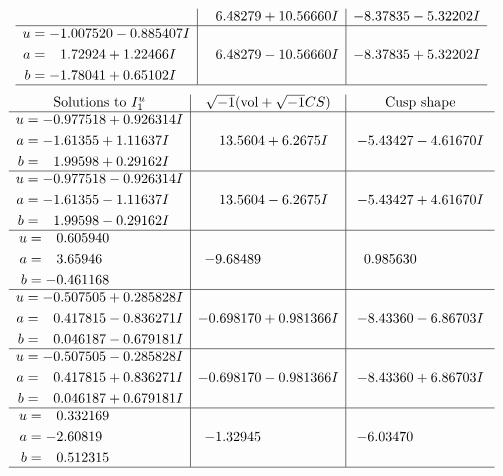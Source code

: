 \documentclass[1p]{elsarticle_modified}
\theoremstyle{definition}
\newcommand{\I}{\sqrt{-1}}
\begin{document}
$$\begin{array}{c|c|c}
 & \phantom{-}6.48279 + 10.56660 I & -8.37835 - 5.32202 I \\ \hline\begin{aligned}
u &= -1.007520 - 0.885407 I \\
a &= \phantom{-}1.72924 + 1.22466 I \\
b &= -1.78041 + 0.65102 I\end{aligned}
 & \phantom{-}6.48279 - 10.56660 I & -8.37835 + 5.32202 I\\
 \hline 
 \end{array}$$\newpage$$\begin{array}{c|c|c}  
\text{Solutions to }I^u_{1}& \I (\text{vol} + \sqrt{-1}CS) & \text{Cusp shape}\\
 \hline 
\begin{aligned}
u &= -0.977518 + 0.926314 I \\
a &= -1.61355 + 1.11637 I \\
b &= \phantom{-}1.99598 + 0.29162 I\end{aligned}
 & \phantom{-}13.5604 + 6.2675 I & -5.43427 - 4.61670 I \\ \hline\begin{aligned}
u &= -0.977518 - 0.926314 I \\
a &= -1.61355 - 1.11637 I \\
b &= \phantom{-}1.99598 - 0.29162 I\end{aligned}
 & \phantom{-}13.5604 - 6.2675 I & -5.43427 + 4.61670 I \\ \hline\begin{aligned}
u &= \phantom{-}0.605940\phantom{ +0.000000I} \\
a &= \phantom{-}3.65946\phantom{ +0.000000I} \\
b &= -0.461168\phantom{ +0.000000I}\end{aligned}
 & -9.68489\phantom{ +0.000000I} & \phantom{-}0.985630\phantom{ +0.000000I} \\ \hline\begin{aligned}
u &= -0.507505 + 0.285828 I \\
a &= \phantom{-}0.417815 - 0.836271 I \\
b &= \phantom{-}0.046187 - 0.679181 I\end{aligned}
 & -0.698170 + 0.981366 I & -8.43360 - 6.86703 I \\ \hline\begin{aligned}
u &= -0.507505 - 0.285828 I \\
a &= \phantom{-}0.417815 + 0.836271 I \\
b &= \phantom{-}0.046187 + 0.679181 I\end{aligned}
 & -0.698170 - 0.981366 I & -8.43360 + 6.86703 I \\ \hline\begin{aligned}
u &= \phantom{-}0.332169\phantom{ +0.000000I} \\
a &= -2.60819\phantom{ +0.000000I} \\
b &= \phantom{-}0.512315\phantom{ +0.000000I}\end{aligned}
 & -1.32945\phantom{ +0.000000I} & -6.03470\phantom{ +0.000000I}\\
 \hline 
 \end{array}$$\newpage\newpage\renewcommand{\arraystretch}{1}
\end{document}
